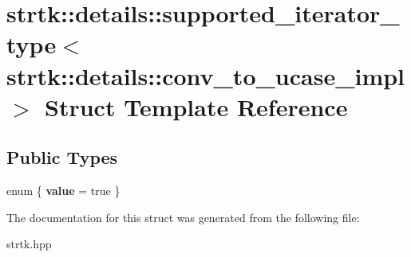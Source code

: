 \hypertarget{structstrtk_1_1details_1_1supported__iterator__type_3_01strtk_1_1details_1_1conv__to__ucase__impl_01_4}{\section{strtk\-:\-:details\-:\-:supported\-\_\-iterator\-\_\-type$<$ strtk\-:\-:details\-:\-:conv\-\_\-to\-\_\-ucase\-\_\-impl $>$ Struct Template Reference}
\label{structstrtk_1_1details_1_1supported__iterator__type_3_01strtk_1_1details_1_1conv__to__ucase__impl_01_4}
}
\subsection*{Public Types}
\begin{DoxyCompactItemize}
\item 
enum \{ {\bfseries value} = true
 \}
\end{DoxyCompactItemize}


The documentation for this struct was generated from the following file\-:\begin{DoxyCompactItemize}
\item 
strtk.\-hpp\end{DoxyCompactItemize}
